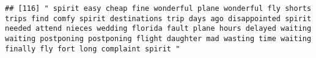 \documentclass[
]{article}
\begin{document}
\begin{verbatim}
## [116] " spirit easy cheap fine wonderful plane wonderful fly shorts trips find comfy spirit destinations trip days ago disappointed spirit needed attend nieces wedding florida fault plane hours delayed waiting waiting postponing postponing flight daughter mad wasting time waiting finally fly fort long complaint spirit "                                                                                                                                                                                                                                                                                                                                                                                                                                                                                                                                                                                                                                                                                                                                                                                                                                                                                                                                                                                                                                                                                                                                                                                                                                                                                                                                                                                                                                                                     

\end{verbatim}
\end{document}
